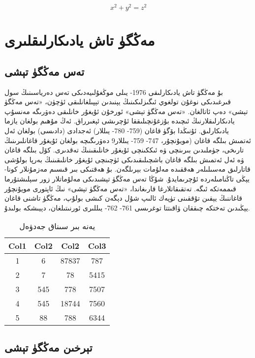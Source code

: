 \documentclass[a4paper]{book}
\begin{document}
\begin{equation}
	x^2 + y^2 = z^2
	\label{test}
\end{equation}


\chapter{مەڭگۈ تاش يادىكارلىقلىرى}

\section{تەس مەڭگۈ تېشى}
بۇ مەڭگۈ تاش يادىكارلىقى 1976- يىلى موڭغۇلىيەدىكى تەس دەرياسىنىڭ سول قىرغىدىكى نوغۇن تولغوي ئىگىزلىكىنىڭ يېنىدىن تېپىلغانلىقى ئۈچۈن، «تەس مەڭگۈ تېشى» دەپ ئاتالغان. «تەس مەڭگۈ تېشى» ئورخۇن ئۇيغۇر خانلىقى دەۋرىگە مەنسۇپ يادىكارلىقلارنىڭ ئىچىدە بۇزغۇنچىلىققا ئۇچرىشى ئېغىرراق. ئەڭ مۇھىم بولغان يازما يادىكارلىق. ئۇنىڭدا بۆگۈ قاغان (759- 780- يىللار) ئەجدادى (دادىسى) بولغان ئەل ئەتمىش بىلگە قاغان (مويۇنچۇر، 747- 759- يىللار9 دەۋرىگىچە بولغان ئۇيغۇر قاغانلىرىنىڭ تارىخى، جۈملىدىن بىرىنچى ۋە ئىككىنچى ئۇيغۇر خانلىقىنىڭ تەقدىرى. كۆل بىلگە قاغان ۋە ئەل ئەتمىش بىلگە قاغان باشچىلىقىدىكى ئۈچىنچى ئۇيغۇر خانلىقىنىڭ بەرپا بولۇشى قاتارلىق مەسىلىلەر ھەققىدە مەلۇمات بېرىلگەن. بۇ ھەقتىكى بىر قىسىم مەزمۇنلار كونا- يېڭى تاڭنامىلەردە ئۇچرىمايدۇ. شۇڭا تەس مەڭگۈ تېشىدىكى مەلۇماتلار زور سېلىشتۇرما قىممەتكە ئىگە. تەتقىقاتلارغا قارىغاندا، «تەس مەڭگۈ تېشى» نىڭ ئاپتورى مويۇنچۇر قاغاننىڭ يېقىن تۇققىنى تۈپەك ئالىپ شۇل دېگەن كىشى بولۇپ، مەڭگۈ تاشنى قاغان يېڭىدىن تەختكە چىققان ۋاقىتتا توغرىسى 761- 762- يىللىرى ئورنىتىلغان، دېيىشكە بولىدۇ.


\begin{table}
	\begin{center}
		\begin{tabular}{||c c c c||} 
			\hline
			Col1 & Col2 & Col2 & Col3 \\ [0.5ex] 
			\hline\hline
			1 & 6 & 87837 & 787 \\ 
			\hline
			2 & 7 & 78 & 5415 \\
			\hline
			3 & 545 & 778 & 7507 \\
			\hline
			4 & 545 & 18744 & 7560 \\
			\hline
			5 & 88 & 788 & 6344 \\ [1ex] 
			\hline
		\end{tabular}
		\caption{يەنە بىر سىناق جەدۋەل}
	\end{center}
\end{table}

\section{تېرخىن مەڭگۈ تېشى}
\end{document}
